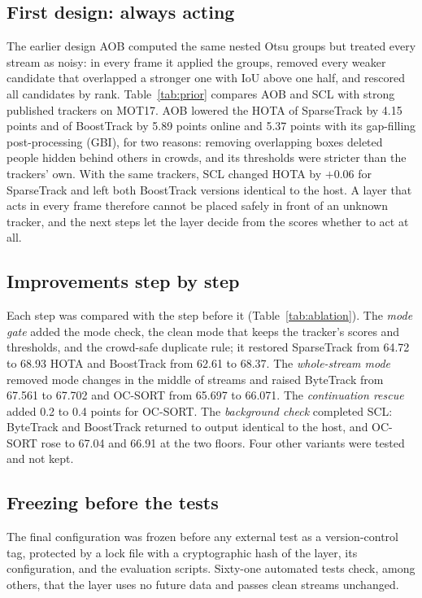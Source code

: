 \documentclass[pdflatex,sn-mathphys-num,iicol]{sn-jnl}
\newcommand{\scl}{SCL}
\newcommand{\aob}{AOB}
\begin{document}
\subsection{First design: always acting}\label{sec:prior}
The earlier design \aob{} computed the same nested Otsu groups but treated every stream as noisy:
in every frame it applied the groups, removed every weaker candidate that overlapped a stronger one
with IoU above one half, and rescored all candidates by rank. Table~\ref{tab:prior} compares \aob{}
and \scl{} with strong published trackers on MOT17. \aob{} lowered the HOTA of SparseTrack by 4.15
points and of BoostTrack by 5.89 points online and 5.37 points with its gap-filling post-processing
(GBI), for two reasons: removing overlapping boxes deleted people hidden behind others in crowds,
and its thresholds were stricter than the trackers' own. With the same trackers, \scl{} changed
HOTA by $+0.06$ for SparseTrack and left both BoostTrack versions identical to the host. A layer
that acts in every frame therefore cannot be placed safely in front of an unknown tracker, and the
next steps let the layer decide from the scores whether to act at all.


\subsection{Improvements step by step}\label{sec:steps}
Each step was compared with the step before it (Table~\ref{tab:ablation}). The \emph{mode gate}
added the mode check, the clean mode that keeps the tracker's scores and thresholds, and the crowd-safe duplicate
rule; it restored SparseTrack from 64.72 to 68.93 HOTA and BoostTrack from 62.61 to 68.37. The
\emph{whole-stream mode} removed mode changes in the middle of streams and raised ByteTrack from
67.561 to 67.702 and OC-SORT from 65.697 to 66.071. The \emph{continuation rescue} added 0.2 to 0.4
points for OC-SORT. The \emph{background check} completed \scl{}: ByteTrack and BoostTrack returned
to output identical to the host, and OC-SORT rose to 67.04 and 66.91 at the two floors. Four other
variants were tested and not kept.


\subsection{Freezing before the tests}\label{sec:freeze}
The final configuration was frozen before any external test as a version-control tag, protected
by a lock file with a cryptographic hash of the layer, its configuration, and the evaluation
scripts. Sixty-one automated tests check, among others, that the layer uses no future data and
passes clean streams unchanged.
\FloatBarrier
\end{document}
